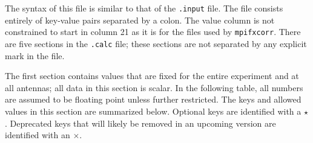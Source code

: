 The syntax of this file is similar to that of the {\tt .input} file.
The file consists entirely of key-value pairs separated by a colon.
The value column is not constrained to start in column 21 as it is for the files used by {\tt mpifxcorr}.
There are five sections in the {\tt .calc} file; these sections are not separated by any explicit mark in the file.

The first section contains values that are fixed for the entire experiment and at all antennas; all data in this section is scalar.
In the following table, all numbers are assumed to be floating point unless further restricted.
The keys and allowed values in this section are summarized below.
Optional keys are identified with a $\star$.
Deprecated keys that will likely be removed in an upcoming version are identified with an $\times$.


